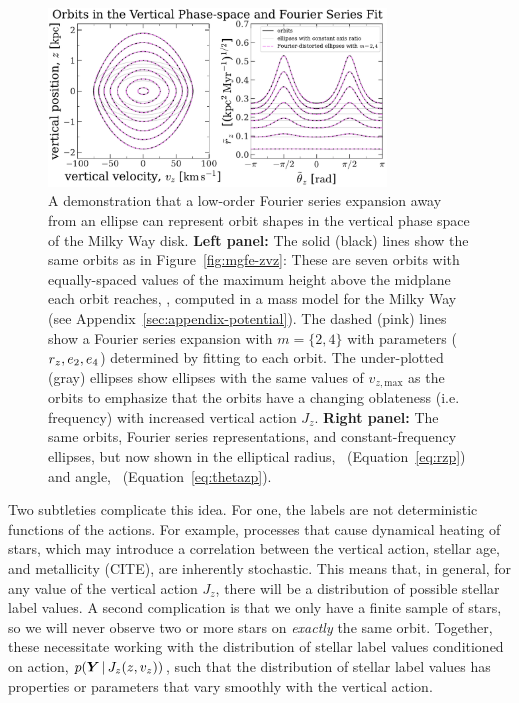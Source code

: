 \begin{figure}[t!]
\begin{center}
\includegraphics[width=0.8\textwidth]{simulated-orbits-fourier.pdf}
\end{center}
\caption{%
A demonstration that a low-order Fourier series expansion away from an ellipse can
represent orbit shapes in the vertical phase space of the Milky Way disk.
\textbf{Left panel:} The solid (black) lines show the same orbits as in
Figure~\ref{fig:mgfe-zvz}: These are seven orbits with equally-spaced values of the
maximum height above the midplane each orbit reaches, \zmax, computed in a mass model
for the Milky Way (see Appendix~\ref{sec:appendix-potential}).
The dashed (pink) lines show a Fourier series expansion with $m=\{2, 4\}$ with
parameters ($r_z, e_2, e_4$) determined by fitting to each orbit.
The under-plotted (gray) ellipses show ellipses with the same values of $v_{z,
\textrm{max}}$ as the orbits to emphasize that the orbits have a changing oblateness
(i.e. frequency) with increased vertical action $J_z$.
\textbf{Right panel:} The same orbits, Fourier series representations, and
constant-frequency ellipses, but now shown in the elliptical radius, \rzp\
(Equation~\ref{eq:rzp}) and angle, \thzp\ (Equation~\ref{eq:thetazp}).
\label{fig:fourier-contours}
}
\end{figure}

Two subtleties complicate this idea.
For one, the labels are not deterministic functions of the actions.
For example, processes that cause dynamical heating of stars, which may introduce a
correlation between the vertical action, stellar age, and metallicity (CITE), are
inherently stochastic.
This means that, in general, for any value of the vertical action $J_z$, there will be
a distribution of possible stellar label values.
A second complication is that we only have a finite sample of stars, so we will
never observe two or more stars on \emph{exactly} the same orbit.
Together, these necessitate working with the distribution of stellar label values
conditioned on action, $p(\boldsymbol{Y} \,|\, J_z(z, v_z))$, such that the distribution of
stellar label values has properties or parameters that vary smoothly with the vertical
action.

